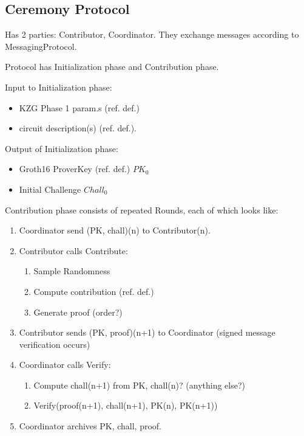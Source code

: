 \subsection{Ceremony Protocol}
Has 2 parties: Contributor, Coordinator. They exchange messages according to MessagingProtocol.

Protocol has Initialization phase and Contribution phase. 

Input to Initialization phase: 
\begin{itemize}
    \item KZG Phase 1 param.s (ref. def.) 
    \item circuit description(s) (ref. def.).
\end{itemize}
Output of Initialization phase:
\begin{itemize}
    \item Groth16 ProverKey (ref. def.) $PK_0$
    \item Initial Challenge $Chall_0$
\end{itemize}

Contribution phase consists of repeated Rounds, each of which looks like:
\begin{enumerate}
\item Coordinator send (PK, chall)(n) to Contributor(n).
\item Contributor calls Contribute:
    \begin{enumerate}
        \item Sample Randomness
        \item Compute contribution (ref. def.)
        \item Generate proof (order?)
    \end{enumerate}
\item Contributor sends (PK, proof)(n+1) to Coordinator (signed message verification occurs)
\item Coordinator calls Verify:
    \begin{enumerate}
        \item Compute chall(n+1) from PK, chall(n)? (anything else?)
        \item Verify(proof(n+1), chall(n+1), PK(n), PK(n+1))
    \end{enumerate}
\item Coordinator archives PK, chall, proof.
\end{enumerate}

